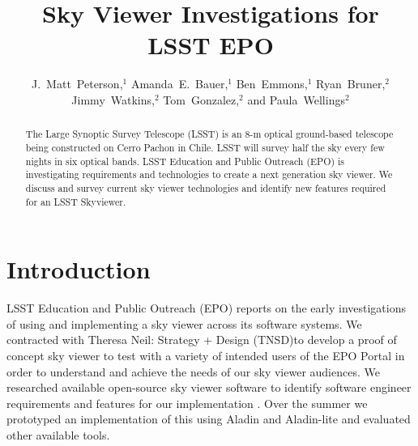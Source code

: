 \documentclass[11pt,twoside]{article}
\begin{document}
\title{Sky Viewer Investigations for LSST EPO}

\author{J.~Matt~Peterson,$^1$ Amanda~E.~Bauer,$^1$ Ben~Emmons,$^1$ Ryan~Bruner,$^2$ Jimmy~Watkins,$^2$ Tom~Gonzalez,$^2$ and Paula~Wellings$^2$}


\begin{abstract}
The Large Synoptic Survey Telescope (LSST) is an 8-m optical ground-based telescope being constructed on Cerro Pachon in Chile. LSST will survey half the sky every few nights in six optical bands. LSST Education and Public Outreach (EPO) is investigating requirements and technologies to create a next generation sky viewer. We discuss and survey current sky viewer technologies and identify new features required for an LSST Skyviewer.
\end{abstract}

\section{Introduction}
LSST Education and Public Outreach (EPO) reports on the early investigations of using and implementing a sky viewer across its software systems. We contracted with Theresa Neil: Strategy + Design (TNSD)\footnotemark[1] to develop a proof of concept sky viewer to test with a variety of intended users of the EPO Portal in order to understand and achieve the needs of our sky viewer audiences. We researched available open-source sky viewer software to identify software engineer requirements and features for our implementation \citep{2017LSST.1.LSE-89,2017LSST.1.LEP-31}. Over the summer we prototyped an implementation of this using Aladin and Aladin-lite \citep{2014ASPC..485..277B} and evaluated other available tools.
\end{document}
